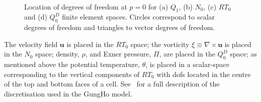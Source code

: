 \documentclass[review,times]{elsarticle}
\begin{document}
\begin{figure}
\centering
{}%
\\
%
%
\caption{\label{fig:fem-spaces} Location of degrees of freedom at $p=0$ for 
(a) $Q_{1}$, (b) $N_0$, (c) $RT_0$ and (d) $Q_0^D$ finite element spaces.
Circles correspond to scalar degrees of freedom and triangles to vector degrees
of freedom.}
\end{figure}
%
The velocity field $\mathbf{u}$ is placed in the $RT_0$ space; the vorticity 
$\xi\equiv\nabla\times\mathbf{u}$ is placed in the $N_0$ space; density, $\rho$, 
and Exner pressure, $\Pi$, are placed in the $Q_0^D$ space; as mentioned above 
the potential temperature, $\theta$, is placed in a scalar-space corresponding 
to the vertical components of $RT_0$ with dofs located in the
centre of the top and bottom faces of a cell. See~\cite{melvin2018} for a full
description of the discretisation used in the GungHo model.
\end{document}
